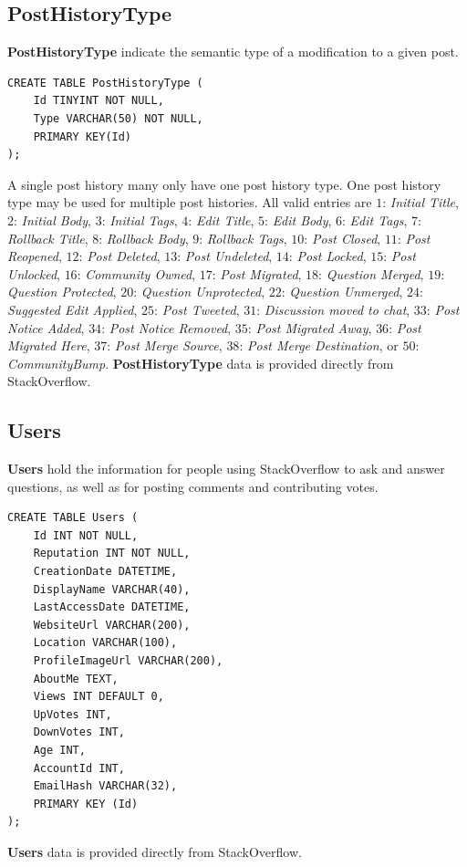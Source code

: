 \documentclass[a4paper,11pt, notitlepage]{report}
\theoremstyle{definition}
\numberwithin{equation}{section}		%
\begin{document}
\subsection{PostHistoryType}
\textbf{PostHistoryType} indicate the semantic type of a modification to a given post.
\begin{lstlisting}
CREATE TABLE PostHistoryType (
    Id TINYINT NOT NULL,
    Type VARCHAR(50) NOT NULL,
    PRIMARY KEY(Id)
);
\end{lstlisting}
A single post history many only have one post history type. One post history type may be used for multiple post histories. All valid entries are $1$: \textit{Initial Title}, $2$: \textit{Initial Body}, $3$: \textit{Initial Tags}, $4$: \textit{Edit Title}, $5$: \textit{Edit Body}, $6$: \textit{Edit Tags}, $7$: \textit{Rollback Title}, $8$: \textit{Rollback Body}, $9$: \textit{Rollback Tags}, $10$: \textit{Post Closed}, $11$: \textit{Post Reopened}, $12$: \textit{Post Deleted}, $13$: \textit{Post Undeleted}, $14$: \textit{Post Locked}, $15$: \textit{Post Unlocked}, $16$: \textit{Community Owned}, $17$: \textit{Post Migrated}, $18$: \textit{Question Merged}, $19$: \textit{Question Protected}, $20$: \textit{Question Unprotected}, $22$: \textit{Question Unmerged}, $24$: \textit{Suggested Edit Applied}, $25$: \textit{Post Tweeted}, $31$: \textit{Discussion moved to chat}, $33$: \textit{Post Notice Added}, $34$: \textit{Post Notice Removed}, $35$: \textit{Post Migrated Away}, $36$: \textit{Post Migrated Here}, $37$: \textit{Post Merge Source}, $38$: \textit{Post Merge Destination}, or $50$: \textit{CommunityBump}. \textbf{PostHistoryType} data is provided directly from StackOverflow.

\subsection{Users}
\textbf{Users} hold the information for people using StackOverflow to ask and answer questions, as well as for posting comments and contributing votes.
\begin{lstlisting}
CREATE TABLE Users (
    Id INT NOT NULL,
    Reputation INT NOT NULL,
    CreationDate DATETIME,
    DisplayName VARCHAR(40),
    LastAccessDate DATETIME,
    WebsiteUrl VARCHAR(200),
    Location VARCHAR(100),
    ProfileImageUrl VARCHAR(200),
    AboutMe TEXT,
    Views INT DEFAULT 0,
    UpVotes INT,
    DownVotes INT,
    Age INT,
    AccountId INT,
    EmailHash VARCHAR(32),
    PRIMARY KEY (Id)
);
\end{lstlisting}
\textbf{Users} data is provided directly from StackOverflow.
\end{document}
